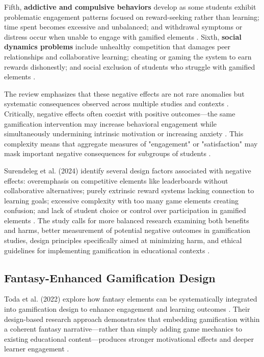 \documentclass[12pt,a4paper]{article}
\begin{document}
Fifth, \textbf{addictive and compulsive behaviors} develop as some students exhibit problematic engagement patterns focused on reward-seeking rather than learning; time spent becomes excessive and unbalanced; and withdrawal symptoms or distress occur when unable to engage with gamified elements \parencite{surendeleg2024}. Sixth, \textbf{social dynamics problems} include unhealthy competition that damages peer relationships and collaborative learning; cheating or gaming the system to earn rewards dishonestly; and social exclusion of students who struggle with gamified elements \parencite{surendeleg2024}.

The review emphasizes that these negative effects are not rare anomalies but systematic consequences observed across multiple studies and contexts \parencite{surendeleg2024}. Critically, negative effects often coexist with positive outcomes—the same gamification intervention may increase behavioral engagement while simultaneously undermining intrinsic motivation or increasing anxiety \parencite{surendeleg2024}. This complexity means that aggregate measures of "engagement" or "satisfaction" may mask important negative consequences for subgroups of students \parencite{surendeleg2024}.

Surendeleg et al. (2024) identify several design factors associated with negative effects: overemphasis on competitive elements like leaderboards without collaborative alternatives; purely extrinsic reward systems lacking connection to learning goals; excessive complexity with too many game elements creating confusion; and lack of student choice or control over participation in gamified elements \parencite{surendeleg2024}. The study calls for more balanced research examining both benefits and harms, better measurement of potential negative outcomes in gamification studies, design principles specifically aimed at minimizing harm, and ethical guidelines for implementing gamification in educational contexts \parencite{surendeleg2024}.


\subsection{Fantasy-Enhanced Gamification Design}

Toda et al. (2022) explore how fantasy elements can be systematically integrated into gamification design to enhance engagement and learning outcomes \parencite{toda2022}. Their design-based research approach demonstrates that embedding gamification within a coherent fantasy narrative—rather than simply adding game mechanics to existing educational content—produces stronger motivational effects and deeper learner engagement \parencite{toda2022}.
\end{document}
